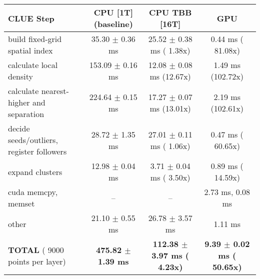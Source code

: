     \begin{tabular}{l|c|c|c}
    \hline
    CLUE Step                                 & CPU [1T] (baseline)         & CPU TBB [16T]                         & GPU                       \\ \hline
    build fixed-grid spatial index            &  35.30 $\pm$  0.36 ms       &  25.52 $\pm$  0.38 ms ( 1.38x)        &   0.44 ms ( 81.08x)       \\
    calculate local density                   & 153.09 $\pm$  0.16 ms       &  12.08 $\pm$  0.08 ms (12.67x)        &   1.49 ms (102.72x)       \\
    calculate nearest-higher and separation   & 224.64 $\pm$  0.15 ms       &  17.27 $\pm$  0.07 ms (13.01x)        &   2.19 ms (102.61x)       \\
    decide seeds/outliers, register followers &  28.72 $\pm$  1.35 ms       &  27.01 $\pm$  0.11 ms ( 1.06x)        &   0.47 ms ( 60.65x)       \\
    expand clusters                           &  12.98 $\pm$  0.04 ms       &   3.71 $\pm$  0.04 ms ( 3.50x)        &   0.89 ms ( 14.59x)       \\ \hline
    cuda memcpy, memset                       & --                          & --                                    &   2.73 ms,   0.08 ms      \\ 
    other                                     &  21.10 $\pm$  0.55 ms       &  26.78 $\pm$  3.57 ms                 &   1.11 ms                 \\ \hline
    \textbf{TOTAL} ( 9000 points per layer)   & \textbf{475.82 $\pm$  1.39 ms} & \textbf{112.38 $\pm$  3.97 ms ( 4.23x)} & \textbf{  9.39 $\pm$  0.02 ms ( 50.65x)}  \\
    \hline 
    \end{tabular}
    \linebreak



